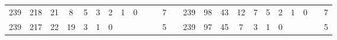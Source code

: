{\begin{tabular}{cccccccccccclccccccccccc}
239                                                & 218                                                & 21                                               & 8                                                & 5                                                & 3                                                & 2                                               & 1                                               & 0                                               &                                                 &                                                 & 7                                                &                          & 239                                                & 98                                                 & 43                                               & 12                                               & 7                                               & 5                                               & 2                                               & 1                                               & 0                                               &                                                 & 7                                                \\
239                                                & 217                                                & 22                                               & 19                                               & 3                                                & 1                                                & 0                                               &                                                 &                                                 &                                                 &                                                 & 5                                                &                          & 239                                                & 97                                                 & 45                                               & 7                                                & 3                                               & 1                                               & 0                                               &                                                 &                                                 &                                                 & 5                                                \\

\end{tabular}}
